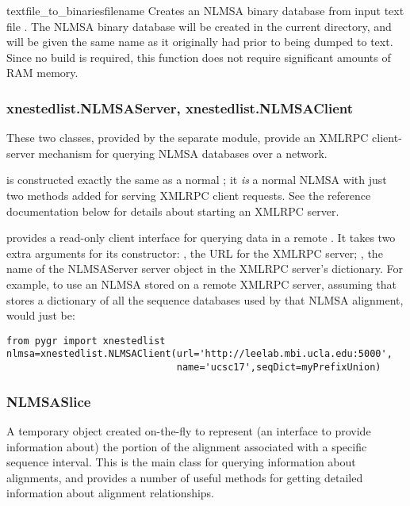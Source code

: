 \documentclass{howto}
\begin{document}
\begin{funcdesc}{textfile_to_binaries}{filename}
  Creates an NLMSA binary database from input text file .
  The NLMSA binary database will be created in the current directory,
  and will be given the same name as it originally had prior to being dumped to text.
  Since no build is required, this function does not require significant amounts
  of RAM memory.
\end{funcdesc}



\subsubsection{xnestedlist.NLMSAServer, xnestedlist.NLMSAClient}
These two classes, provided by the separate  module,
provide an XMLRPC client-server mechanism for querying NLMSA databases
over a network.  

 is constructed exactly the same as a normal ;
it {\em is} a normal NLMSA with just two methods added for serving XMLRPC client
requests.  See the  reference 
documentation below for details about starting an XMLRPC server.

 provides a read-only client interface for querying
data in a remote .  It takes two extra arguments for
its constructor: , the URL for the XMLRPC server; ,
the name of the NLMSAServer server object in the XMLRPC server's dictionary.
For example, to use an NLMSA stored on a remote XMLRPC server,
assuming that  stores a dictionary of all the
sequence databases used by that NLMSA alignment, would just be:
\begin{verbatim}
from pygr import xnestedlist
nlmsa=xnestedlist.NLMSAClient(url='http://leelab.mbi.ucla.edu:5000',
                              name='ucsc17',seqDict=myPrefixUnion)
\end{verbatim}


\subsubsection{NLMSASlice}
A temporary object created on-the-fly to represent (an interface to provide 
information about) the portion of the alignment associated with a specific
sequence interval.  This is the main class for querying information about
alignments, and provides a number of useful methods for getting 
detailed information about alignment relationships.
\end{document}

